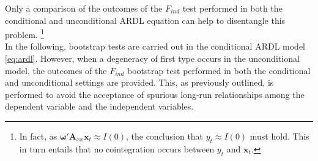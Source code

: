 Only a comparison of the outcomes of the $F_{ind}$ test performed in both the conditional and unconditional ARDL equation can help to disentangle this problem. 
\footnote{In fact, as $\boldsymbol{\omega}'\mathbf{A}_{xx}\mathbf{x}_{t} \approx I(0)$, the conclusion that $y_{t}\approx I(0)$ must hold. This in turn entails that no cointegration occurs between $y_t$ and $\mathbf{x}_{t}$.} \\
In the following, bootstrap tests are carried out in the conditional ARDL model \eqref{eq:ardl}. However, when a degeneracy of first type occurs in the unconditional model, the outcomes of the $F_{ind}$ bootstrap test performed in both the conditional and unconditional settings are provided. This, as previously outlined, is performed to avoid the acceptance of spurious long-run relationships among the dependent variable and the independent variables.

